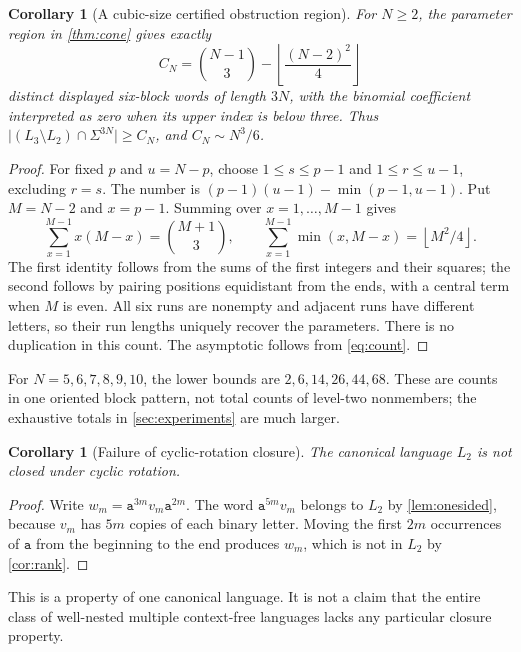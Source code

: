 \documentclass[11pt,letterpaper]{article}
\numberwithin{equation}{section}
\newtheorem{corollary}[theorem]{Corollary}
\theoremstyle{definition}
\theoremstyle{remark}
\newcommand{\len}[1]{\lvert #1\rvert}
\renewcommand{\aa}{\mathtt a}
\begin{document}
\begin{corollary}[A cubic-size certified obstruction region]
\label{cor:count}
For \(N\geq2\), the parameter region in \cref{thm:cone} gives exactly
\begin{equation}\label{eq:count}
 C_N=\binom{N-1}{3}-\left\lfloor\frac{(N-2)^2}{4}\right\rfloor
\end{equation}
distinct displayed six-block words of length \(3N\), with the binomial
coefficient interpreted as zero when its upper index is below three.
Thus \(\len{(L_3\setminus L_2)\cap\Sigma^{3N}}\geq C_N\), and
\(C_N\sim N^3/6\).
\end{corollary}
\begin{proof}
For fixed \(p\) and \(u=N-p\), choose
\(1\leq s\leq p-1\) and \(1\leq r\leq u-1\), excluding \(r=s\).
The number is
\((p-1)(u-1)-\min(p-1,u-1)\). Put \(M=N-2\) and \(x=p-1\).
Summing over \(x=1,\ldots,M-1\) gives
\[
 \sum_{x=1}^{M-1}x(M-x)=\binom{M+1}{3},\qquad
 \sum_{x=1}^{M-1}\min(x,M-x)=\left\lfloor M^2/4\right\rfloor.
\]
The first identity follows from the sums of the first integers and their
squares; the second follows by pairing positions equidistant from the
ends, with a central term when \(M\) is even. All six runs are nonempty
and adjacent runs have different letters, so their run lengths uniquely
recover the parameters. There is no duplication in this count. The
asymptotic follows from \eqref{eq:count}.
\end{proof}

For \(N=5,6,7,8,9,10\), the lower bounds are
\(2,6,14,26,44,68\). These are counts in one oriented block pattern,
not total counts of level-two nonmembers; the exhaustive totals in
\cref{sec:experiments} are much larger.

\begin{corollary}[Failure of cyclic-rotation closure]
\label{cor:rotation}
The canonical language \(L_2\) is not closed under cyclic rotation.
\end{corollary}
\begin{proof}
Write \(w_m=\aa^{3m}v_m\aa^{2m}\). The word
\(\aa^{5m}v_m\) belongs to \(L_2\) by \cref{lem:onesided}, because
\(v_m\) has \(5m\) copies of each binary letter. Moving the first
\(2m\) occurrences of \(\aa\) from the beginning to the end produces
\(w_m\), which is not in \(L_2\) by \cref{cor:rank}.
\end{proof}

This is a property of one canonical language. It is not a claim that the
entire class of well-nested multiple context-free languages lacks any
particular closure property.
\end{document}
